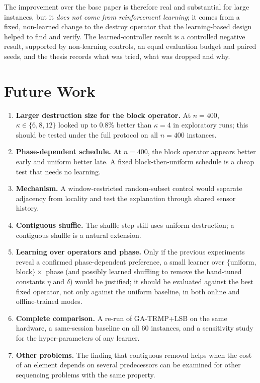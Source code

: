 The improvement over the base paper is therefore real and substantial for large instances, but it \emph{does not come from reinforcement learning}; it comes from a fixed, non-learned change to the destroy operator that the learning-based design helped to find and verify. The learned-controller result is a controlled negative result, supported by non-learning controls, an equal evaluation budget and paired seeds, and the thesis records what was tried, what was dropped and why.


\section{Future Work}

\begin{enumerate}
\item \textbf{Larger destruction size for the block operator.} At $n=400$, $\kappa\in\{6,8,12\}$ looked up to $0.8\%$ better than $\kappa=4$ in exploratory runs; this should be tested under the full protocol on all $n=400$ instances.
\item \textbf{Phase-dependent schedule.} At $n=400$, the block operator appears better early and uniform better late. A fixed block-then-uniform schedule is a cheap test that needs no learning.
\item \textbf{Mechanism.} A window-restricted random-subset control would separate adjacency from locality and test the explanation through shared sensor history.
\item \textbf{Contiguous shuffle.} The shuffle step still uses uniform destruction; a contiguous shuffle is a natural extension.
\item \textbf{Learning over operators and phase.} Only if the previous experiments reveal a confirmed phase-dependent preference, a small learner over $\{$uniform, block$\}\times$ phase (and possibly learned shuffling to remove the hand-tuned constants $\eta$ and $\delta$) would be justified; it should be evaluated against the best fixed operator, not only against the uniform baseline, in both online and offline-trained modes.
\item \textbf{Complete comparison.} A re-run of GA-TRMP+LSB on the same hardware, a same-session baseline on all 60 instances, and a sensitivity study for the hyper-parameters of any learner.
\item \textbf{Other problems.} The finding that contiguous removal helps when the cost of an element depends on several predecessors can be examined for other sequencing problems with the same property.
\end{enumerate}
